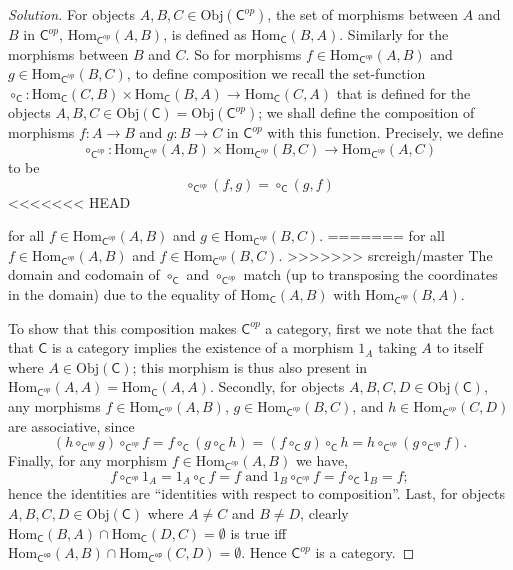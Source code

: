 \documentclass[fontsize=14pt]{scrartcl}
\theoremstyle{definition}
\newenvironment{solution}{
  \begin{proof}[Solution]
  \vspace{-8px}
  \setlength{\parskip}{4px}
  \setlength{\parindent}{0px}
}{
  \end{proof}
}
\newcommand{\Obj}{\mathrm{Obj}}
\newcommand{\Hom}{\mathrm{Hom}}
\begin{document}
\begin{solution}
For objects $A,B,C\in\Obj(\mathsf{C}^{op})$, the set of morphisms between $A$
and $B$ in $\mathsf{C}^{op}$, $\Hom_{\mathsf{C}^{op}}(A,B)$, is defined as
$\Hom_{\mathsf{C}}(B, A)$. Similarly for the morphisms between $B$ and $C$. So
for morphisms $f\in\Hom_{\mathsf{C}^{op}}(A,B)$ and
$g\in\Hom_{\mathsf{C}^{op}}(B,C)$, to define composition we recall the
set-function $\circ_{\mathsf{C}} : \Hom_{\mathsf{C}}(C,B) \times
\Hom_{\mathsf{C}}(B,A) \to\Hom_{\mathsf{C}}(C,A)$ that is defined for the
objects $A,B,C\in\Obj(\mathsf{C})=\Obj(\mathsf{C}^{op})$; we shall define the
composition of morphisms $f:A\to B$ and $g:B\to C$ in $\mathsf{C}^{op}$ with
this function. Precisely, we define
%
\[ \circ_{\mathsf{C}^{op}}: \Hom_{\mathsf{C}^{op}}(A,B) \times
\Hom_{\mathsf{C}^{op}}(B,C) \to \Hom_{\mathsf{C}^{op}}(A,C) \]
%
to be
%
\[ \circ_{\mathsf{C}^{op}}(f,g) = \circ_{\mathsf{C}}(g,f) \]
<<<<<<< HEAD

for all $f\in\Hom_{\mathsf{C}^{op}}(A,B)$ and $g\in\Hom_{\mathsf{C}^{op}}(B,C)$.
=======
%
for all $f\in\Hom_{\mathsf{C}^{op}}(A,B)$ and $f\in\Hom_{\mathsf{C}^{op}}(B,C)$.
>>>>>>> srcreigh/master
The domain and codomain of $\circ_{\mathsf{C}}$ and $\circ_{\mathsf{C}^{op}}$
match (up to transposing the coordinates in the domain) due to the equality of
$\Hom_{\mathsf{C}}(A,B)$ with $\Hom_{\mathsf{C}^{op}}(B,A)$.

To show that this composition makes $\mathsf{C}^{op}$ a category, first we note
that the fact that $\mathsf{C}$ is a category implies the existence of a
morphism $1_{A}$ taking $A$ to itself where $A\in\Obj(\mathsf{C})$; this
morphism is thus also present in $\Hom_{\mathsf{C}^{op}}(A,A) =
\Hom_{\mathsf{C}}(A,A)$. Secondly, for objects $A,B,C,D\in\Obj(\mathsf{C})$, any
morphisms $f\in\Hom_{\mathsf{C}^{op}}(A,B)$, $g\in\Hom_{\mathsf{C}^{op}}(B,C)$,
and $h\in\Hom_{\mathsf{C}^{op}}(C,D)$ are associative, since
%
\[ (h \circ_{\mathsf{C}^{op}} g) \circ_{\mathsf{C}^{op}} f = f
\circ_{\mathsf{C}} (g \circ_{\mathsf{C}} h) = (f \circ_{\mathsf{C}} g)
\circ_{\mathsf{C}} h = h \circ_{\mathsf{C}^{op}} (g \circ_{\mathsf{C}^{op}} f).
\]
%
Finally, for any morphism $f\in\Hom_{\mathsf{C}^{op}}(A,B)$ we have,
%
\[ f \circ_{\mathsf{C}^{op}} 1_A = 1_A \circ_{\mathsf{C}} f = f \text{ and }
1_B \circ_{\mathsf{C}^{op}} f = f \circ_{\mathsf{C}} 1_B = f; \]
%
hence the identities are ``identities with respect to composition''. Last, for
objects $A,B,C,D\in\Obj(\mathsf{C})$ where $A\neq C$ and $B\neq D$,
clearly $\Hom_{\mathsf{C}}(B,A)\cap\Hom_{\mathsf{C}}(D,C)=\emptyset$ is true iff 
$\Hom_{\mathsf{C^{op}}}(A,B)\cap\Hom_{\mathsf{C^{op}}}(C,D)=\emptyset$. Hence
$\mathsf{C}^{op}$ is a category.
\end{solution}
\end{document}
